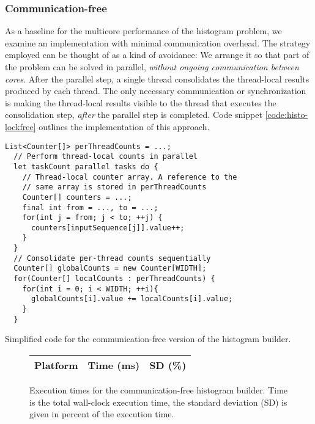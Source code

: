 \subsubsection{Communication-free}
As a baseline for the multicore performance of the histogram problem, we examine
an implementation with minimal communication overhead. The strategy employed can
be thought of as a kind of avoidance: We arrange it so that part of the problem
can be solved in parallel, \textit{without ongoing communication between cores}.
After the parallel step, a single thread consolidates the thread-local
results produced by each thread. The only necessary communication or
synchronization is making the thread-local results visible to the thread that
executes the consolidation step, \textit{after} the parallel step is completed. Code snippet
\ref{code:histo-lockfree} outlines the implementation of this approach.

\begin{code}
\begin{Verbatim}[frame=single]
  List<Counter[]> perThreadCounts = ...;
  // Perform thread-local counts in parallel
  let taskCount parallel tasks do {
    // Thread-local counter array. A reference to the
    // same array is stored in perThreadCounts
    Counter[] counters = ...;
    final int from = ..., to = ...;
    for(int j = from; j < to; ++j) {
      counters[inputSequence[j]].value++;
    }
  }
  // Consolidate per-thread counts sequentially
  Counter[] globalCounts = new Counter[WIDTH];
  for(Counter[] localCounts : perThreadCounts) {
    for(int i = 0; i < WIDTH; ++i){
      globalCounts[i].value += localCounts[i].value;
    }
  }
\end{Verbatim}
	\caption{Simplified code for the communication-free version of the
	histogram builder.}
	\label{code:histo-lockfree}
\end{code}

\begin{figure}[hbtp]
	\centering
	\begin{tabular}{l r r}
		\hline
		\hline
		Platform & Time (ms) & SD (\%) \\
		\hline
		
		\hline
		\hline
	\end{tabular}
	\caption{Execution times for the communication-free histogram builder. Time
is the total wall-clock execution time, the standard deviation (SD) is given in
percent of the execution time.} \label{table:histo-lockfree}
\end{figure}

